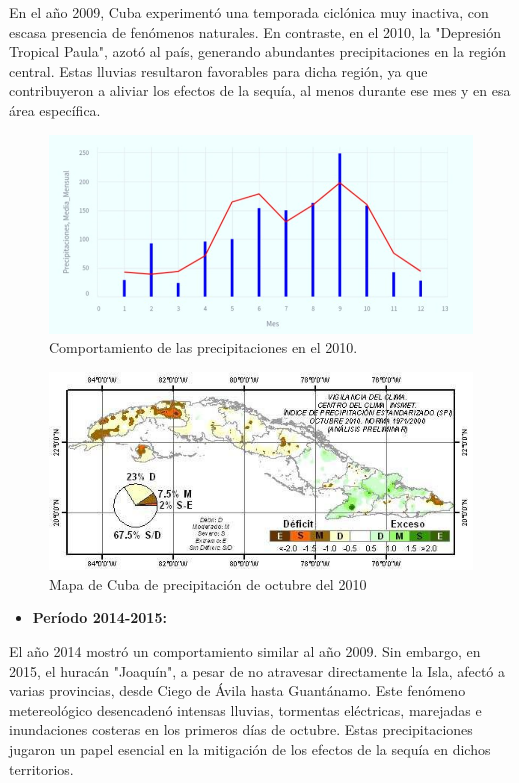 \documentclass[12pt]{article}
\begin{document}
	En el año 2009, Cuba experimentó una temporada ciclónica muy inactiva, con escasa presencia de fenómenos naturales. En contraste, en el 2010, la "Depresión Tropical Paula", azotó al país, generando abundantes precipitaciones en la región central. Estas lluvias resultaron favorables para dicha región, ya que contribuyeron a aliviar los efectos de la sequía, al menos durante ese mes y en esa área específica.\cite{webpage6}\cite{webpage7}
	
	\begin{figure}[H]
		\centering
		\includegraphics[width=0.6\linewidth]{./Report/images/precipitaciones_2010}
		\caption{Comportamiento de las precipitaciones en el 2010.}
		\label{fig:precipitaciones2010}
	\end{figure}
	
	
	\begin{figure}[H]
		\centering
		\includegraphics[width=0.7\linewidth]{./Report/images/mapa}
		\caption{Mapa de Cuba de precipitación de octubre del 2010}
		\label{fig:mapa}
	\end{figure}
	
	\begin{itemize}
		\item \textbf{Período 2014-2015:}
	\end{itemize}
	
	El año 2014 mostró un comportamiento similar al año 2009. Sin embargo, en 2015, el huracán "Joaquín", a pesar de no atravesar directamente la Isla, afectó a varias provincias, desde Ciego de Ávila hasta Guantánamo. Este fenómeno metereológico desencadenó intensas lluvias, tormentas eléctricas, marejadas e inundaciones costeras en los primeros días de octubre. Estas precipitaciones jugaron un papel esencial en la  mitigación de los efectos de la sequía en dichos territorios.\cite{webpage6}\cite{webpage8}
	
\end{document}
